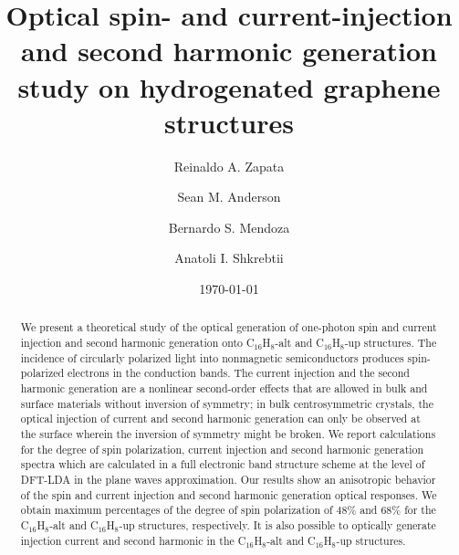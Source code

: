 \documentclass[aps,pra,11pt,tightenlines,showpacs,superscriptaddress,groupedaddress]{revtex4-1}
\newcommand{\altstc}{C$_{16}$H$_{8}$-alt}
\newcommand{\upstc}{C$_{16}$H$_{8}$-up}
\begin{document}
\title{Optical spin- and current-injection and second harmonic generation study on hydrogenated graphene structures}

\author{Reinaldo A. Zapata}
\author{Sean M. Anderson}
\author{Bernardo S. Mendoza}
\author{Anatoli I. Shkrebtii}

\date{\today}



\begin{abstract}

We present a theoretical study of the optical generation of one-photon spin and
current injection and second harmonic generation onto {\altstc} and {\upstc} structures. The incidence of
circularly polarized light into nonmagnetic semiconductors produces spin-
polarized electrons in the conduction bands. The current injection and the
second harmonic generation are a nonlinear second-order effects that are
allowed in bulk and surface materials without inversion of symmetry; in bulk 
centrosymmetric crystals, the optical injection of current and second harmonic generation can
only be observed at the surface wherein the inversion of symmetry might be
broken. We report calculations for the degree of spin polarization, current
injection and second harmonic generation spectra which are calculated in a full
electronic band structure scheme at the level of DFT-LDA in the plane waves
approximation. Our results show an anisotropic behavior of the spin and
current injection and second harmonic generation optical responses. We obtain
maximum percentages of the degree of spin polarization of 48\% and 68\% for the
{\altstc} and {\upstc} structures, respectively. It is also possible to
optically generate injection current and second harmonic in the {\altstc} and
{\upstc} structures.

\end{abstract}



\maketitle
\end{document}
